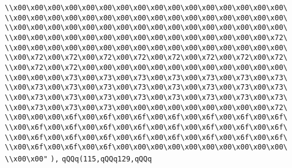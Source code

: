 \verb|\\x00\x00\x00\x00\x00\x00\x00\x00\x00\x00\x00\x00\x00\x00\x00\x00\|\newline
\verb|\\x00\x00\x00\x00\x00\x00\x00\x00\x00\x00\x00\x00\x00\x00\x00\x00\|\newline
\verb|\\x00\x00\x00\x00\x00\x00\x00\x00\x00\x00\x00\x00\x00\x00\x00\x00\|\newline
\verb|\\x00\x00\x00\x00\x00\x00\x00\x00\x00\x00\x00\x00\x00\x00\x00\x72\|\newline
\verb|\\x00\x00\x00\x00\x00\x00\x00\x00\x00\x00\x00\x00\x00\x00\x00\x00\|\newline
\verb|\\x00\x72\x00\x72\x00\x72\x00\x72\x00\x72\x00\x72\x00\x72\x00\x72\|\newline
\verb|\\x00\x72\x00\x72\x00\x00\x00\x00\x00\x00\x00\x00\x00\x00\x00\x00\|\newline
\verb|\\x00\x00\x00\x73\x00\x73\x00\x73\x00\x73\x00\x73\x00\x73\x00\x73\|\newline
\verb|\\x00\x73\x00\x73\x00\x73\x00\x73\x00\x73\x00\x73\x00\x73\x00\x73\|\newline
\verb|\\x00\x73\x00\x73\x00\x73\x00\x73\x00\x73\x00\x73\x00\x73\x00\x73\|\newline
\verb|\\x00\x73\x00\x73\x00\x73\x00\x00\x00\x00\x00\x00\x00\x00\x00\x72\|\newline
\verb|\\x00\x00\x00\x6f\x00\x6f\x00\x6f\x00\x6f\x00\x6f\x00\x6f\x00\x6f\|\newline
\verb|\\x00\x6f\x00\x6f\x00\x6f\x00\x6f\x00\x6f\x00\x6f\x00\x6f\x00\x6f\|\newline
\verb|\\x00\x6f\x00\x6f\x00\x6f\x00\x6f\x00\x6f\x00\x6f\x00\x6f\x00\x6f\|\newline
\verb|\\x00\x6f\x00\x6f\x00\x6f\x00\x00\x00\x00\x00\x00\x00\x00\x00\x00\|\newline
\verb|\\x00\x00"|\newline
\verb|),|\newline
\verb|qQQq(115,qQQq129,qQQq|\newline
